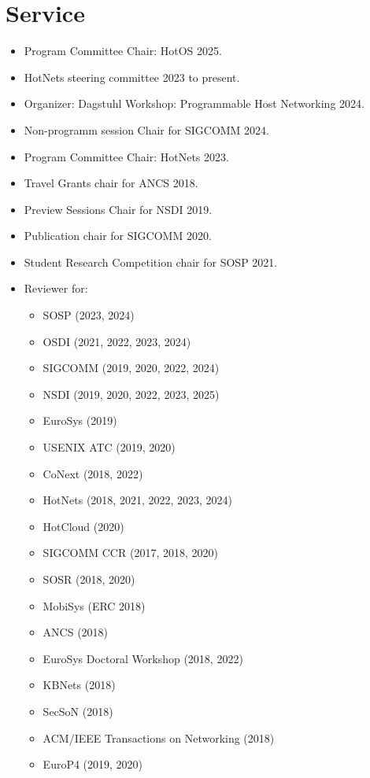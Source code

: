 \documentclass[11pt,letterpaper,sans]{moderncv}        %
\begin{document}
\section{Service}
\begin{itemize}
    \item Program Committee Chair: HotOS 2025.
    \item HotNets steering committee 2023 to present.
    \item Organizer: Dagstuhl Workshop: Programmable Host Networking
        2024.
    \item Non-programm session Chair for SIGCOMM 2024.
    \item Program Committee Chair: HotNets 2023.
    \item Travel Grants chair for ANCS 2018.
    \item Preview Sessions Chair for NSDI 2019.
    \item Publication chair for SIGCOMM 2020. 
    \item Student Research Competition chair for SOSP 2021. 
    \item Reviewer for:
        \begin{itemize}
            \item SOSP (2023, 2024)
            \item OSDI (2021, 2022, 2023, 2024)
            \item SIGCOMM (2019, 2020, 2022, 2024)
            \item NSDI (2019, 2020, 2022, 2023, 2025)
            \item EuroSys (2019)
            \item USENIX ATC (2019, 2020)
            \item CoNext (2018, 2022)
            \item HotNets (2018, 2021, 2022, 2023, 2024)
            \item HotCloud (2020)
            \item SIGCOMM CCR (2017, 2018, 2020)
            \item SOSR (2018, 2020)
            \item MobiSys (ERC 2018)
            \item ANCS (2018)
            \item EuroSys Doctoral Workshop (2018, 2022)
            \item KBNets (2018)
            \item SecSoN (2018)
            \item ACM/IEEE Transactions on Networking (2018)
            \item EuroP4 (2019, 2020)
        \end{itemize}
\end{itemize}
\end{document}
